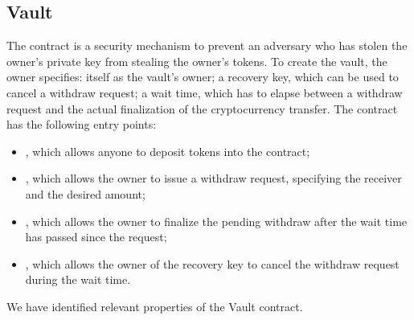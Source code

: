     
    


\subsection{Vault}

The  contract is a security mechanism to prevent an adversary who has stolen the owner's private key from stealing the owner's tokens.
To create the vault, the owner specifies:
itself as the vault's owner;
a recovery key, which can be used to cancel a withdraw request;
a wait time, which has to elapse between a withdraw request and the actual finalization of the cryptocurrency transfer.
The contract has the following entry points:
\begin{itemize}

\item {}, which allows anyone to deposit tokens into the contract;

\item {}, which allows the owner to issue a withdraw request, specifying the receiver and the desired amount;

\item {}, which allows the owner to finalize the pending withdraw after the wait time has passed since the request;

\item {}, which allows the owner of the recovery key to cancel the withdraw request during the wait time.
\end{itemize}
%
We have identified \nVaultProperties relevant properties of the Vault contract. 

